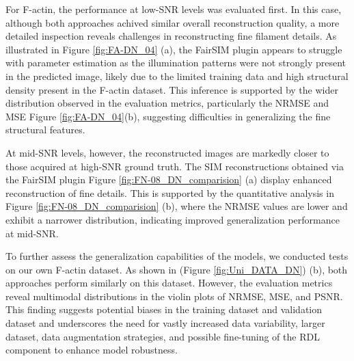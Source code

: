 \documentclass[11pt,
  paper=a4, 
  bibliography=totocnumbered,
	captions=tableheading,
	BCOR=10mm
]{scrreprt}
\theoremstyle{definition}
\newcommand{\figref}[1]{(Figure \ref{#1})}
\newcommand{\figureref}[1]{Figure \ref{#1}}
\begin{document}
For F-actin, the performance at low-SNR levels was evaluated first. In this case, although both approaches achived similar 
overall reconstruction quality, a more detailed inspection reveals challenges in reconstructing fine filament details.
 As illustrated in \figureref{fig:FA-DN_04} (a), the FairSIM plugin appears to struggle with parameter estimation as the 
 illumination patterns were not strongly present in the predicted image, likely 
 due to the limited training data and high structural density present in the F-actin dataset. This inference is supported 
 by the wider distribution observed in the evaluation metrics, particularly the NRMSE and MSE \figureref{fig:FA-DN_04}(b), 
 suggesting difficulties in generalizing the fine structural features.


\vspace{1cm}
\noindent
At mid-SNR levels, however, the reconstructed images are markedly closer to those acquired at high-SNR ground truth. The SIM 
reconstructions obtained via the FairSIM plugin \figureref{fig:FN-08_DN_comparision} (a) display enhanced reconstruction of fine details.
 This is supported by the quantitative analysis in \figureref{fig:FN-08_DN_comparision} (b), where the NRMSE values are lower and exhibit
  a narrower distribution, indicating improved generalization performance at mid-SNR.



\vspace{1cm}
\noindent
To further assess the generalization capabilities of the models, we conducted tests on our own F-actin dataset. 
As shown in \figref{fig:Uni_DATA_DN} (b), both approaches perform similarly on this dataset. However, the evaluation metrics 
reveal multimodal distributions in the violin plots of NRMSE, MSE, and PSNR. This finding suggests potential biases in the 
training dataset and validation dataset and underscores the need for vastly increased data variability, larger dataset, data augmentation strategies, and possible fine-tuning
 of the RDL component to enhance model robustness.
\end{document}
